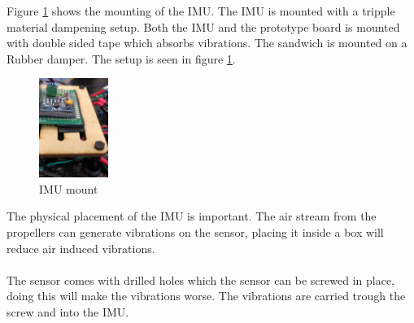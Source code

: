 Figure \ref{fig:PIKK2} shows the mounting of the IMU. The IMU is mounted with a tripple material dampening setup. Both the IMU and the prototype board is mounted with double sided tape which absorbs vibrations. The sandwich is mounted on a Rubber damper. The setup is seen in figure \ref{fig:PIKK2}.
\begin{figure}[H]
    \centering
         \includegraphics[width = 0.2\textwidth]{NoisePictures/SensorDritt.jpg}
      \caption{IMU mount}
    \label{fig:PIKK2}
\end{figure} 
The physical placement of the IMU is important. The air stream from the propellers can generate vibrations on the sensor, placing it inside a box will reduce air induced vibrations.
\\
\\
The sensor comes with drilled holes which the sensor can be screwed in place,  doing this will make the vibrations worse. The vibrations are carried trough the screw and into the IMU.
